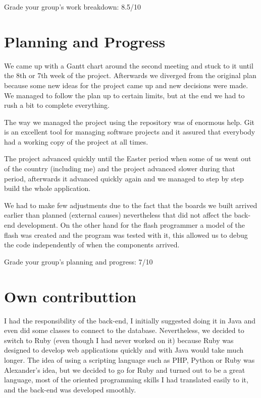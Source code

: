 Grade your group’s work breakdown: 8.5/10

\section{Planning and Progress}

We came up with a Gantt chart around the second meeting and stuck to it until the 8th or 7th week of the project. Afterwards we diverged from the original plan 
because some new ideas for the project came up and new decisions were made.  We managed to follow the plan up to certain limits, but at the end we had to rush a 
bit to complete everything. 

The way we managed the project using the repository was of enormous help. Git is an excellent tool for managing software projects and it assured that everybody 
had a working copy of the project at all times. 

The project advanced quickly until the Easter period when some of us went out of the country (including me) and the project advanced slower during that period, 
afterwards it advanced quickly again and we managed to step by step build the whole application.

We had to make few adjustments due to the fact that the boards we built arrived earlier than planned (external causes) nevertheless that did not affect the 
back-end development. On the other hand for the flash programmer a model of the flash was created and the program was tested with it, this allowed us to debug 
the code independently of when the components arrived.

Grade your group’s planning and progress:	7/10

\section{Own contributtion}

I had the responsibility of the back-end, I initially suggested doing it in Java and even did some classes to connect to the database. Nevertheless, we decided 
to switch to Ruby (even though I had never worked on it) because Ruby was designed to develop web applications quickly and with Java would take much longer. The 
idea of using a scripting language such as PHP, Python or Ruby was Alexander's idea, but we decided to go for Ruby and turned out to be a great language, most of 
the oriented programming skills I had translated easily to it, and the back-end was developed smoothly. 


